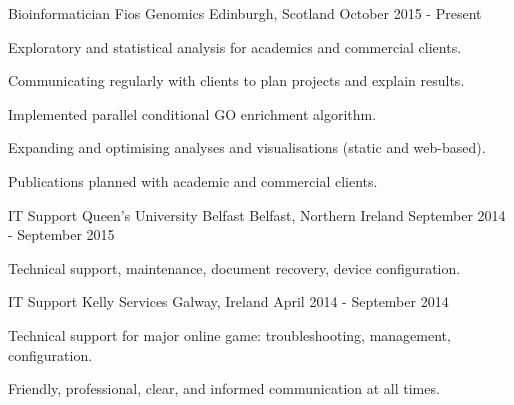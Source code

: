 


\begin{cventries}
\cventry
{Bioinformatician} %
{Fios Genomics} %
{Edinburgh, Scotland} %
{October 2015 - Present} %
{ %
\begin{cvitems}
\item {Exploratory and statistical analysis for academics and commercial clients.}
\item {Communicating regularly with clients to plan projects and explain results.}
\item {Implemented parallel conditional GO enrichment algorithm.}
\item {Expanding and optimising analyses and visualisations (static and web-based).}
\item {Publications planned with academic and commercial clients. }
\end{cvitems}
}
\cventry
{IT Support} %
{Queen's University Belfast} %
{Belfast, Northern Ireland} %
{September 2014 - September 2015} %
{ %
\begin{cvitems}
\item {Technical support, maintenance, document recovery, device configuration.}
\end{cvitems}
}
\cventry
{IT Support} %
{Kelly Services} %
{Galway, Ireland} %
{April 2014 - September 2014} %
{ %
\begin{cvitems}
\item {Technical support for major online game: troubleshooting, management, configuration.}
\item {Friendly, professional, clear, and informed communication at all times.}
\end{cvitems}
}
\end{cventries}

